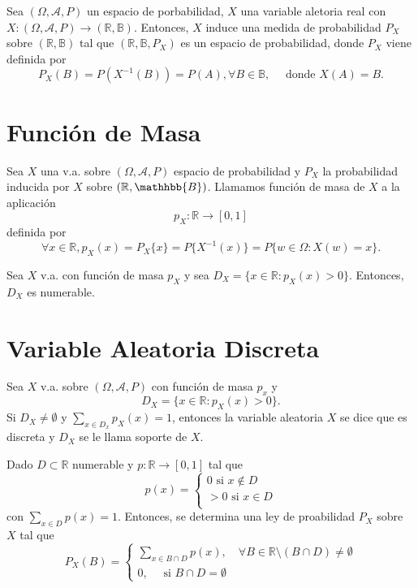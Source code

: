\begin{prop}
  Sea $(\Omega, \mathcal{A}, P )$ un espacio de porbabilidad, $X$ una variable aletoria real con $X : (\Omega, \mathcal{A}, P ) \to (\mathbb{R}, \mathbb{B})$. Entonces, $X$ induce una medida de probabilidad $P_{X}$ sobre $(\mathbb{R}, \mathbb{B})$ tal que $(\mathbb{R}, \mathbb{B}, P_{X})$ es un espacio de probabilidad, donde $P_{X}$ viene definida por
  \[
    P_{X}(B) = P(X^{-1}(B)) = P(A), \forall B \in \mathbb{B}, \quad \text{ donde } X(A) = B.
  \]
\end{prop}

\section{Función de Masa}

\begin{defn}
  Sea $X$ una v.a. sobre $(\Omega, \mathcal{A}, P )$ espacio de probabilidad y $P_{X}$ la probabilidad inducida por $X$ sobre $(\mathbb{R}, \mathhbb{B})$. Llamamos función de masa de $X$ a la aplicación
  \[ 
    p_{X} : \mathbb{R} \to [0,1] 
  \] 
  definida por
  \[ 
    \forall x \in \mathbb{R}, p_{X}(x) = P_{X}\{ x \} = P \{  X^{-1}(x)  \} = P \{  w \in \Omega :  X(w) = x \}.
  \] 
\end{defn}

\begin{prop}
  Sea $X$ v.a. con función de masa $p_{X}$ y sea $D_{X} = \{ x \in \mathbb{R} : p_{X}(x) > 0 \}$. Entonces, $D_{X}$ es numerable.
\end{prop}

\section{Variable Aleatoria Discreta}

\begin{defn}
  Sea $X$ v.a. sobre $(\Omega, \mathcal{A}, P )$ con función de masa $p_{x}$ y
  \[
    D_{X} = \{  x \in \mathbb{R}: p_{X}(x) > 0 \}.
  \]
  Si $D_{X} \neq \emptyset$ y $\sum_{x \in D_{x}} p_{X}(x) = 1$, entonces la variable aleatoria $X$ se dice que es discreta y $D_{X}$ se le llama soporte de $X$.
\end{defn}

\begin{prop}
  Dado $D \subset \mathbb{R}$ numerable y $p :  \mathbb{R} \to [0, 1]$ tal que
  \[
    p(x)  =
    \begin{cases}
      0 \text{ si } x \not \in D \\
      >0 \text{ si } x \in D \\
    \end{cases}
  \]
  con $\sum_{x \in D} p(x) = 1$. Entonces, se determina una ley de proabilidad $P_{X}$ sobre $X$ tal que
  \[ 
    P_{X}(B)  =
    \begin{cases}
      \sum_{x \in B \cap D} p(x), \quad \forall B \in \mathbb{R} \setminus (B \cap D) \neq \emptyset \\
      0, \quad \text{ si } B \cap D = \emptyset
    \end{cases} 
  \] 
\end{prop}

